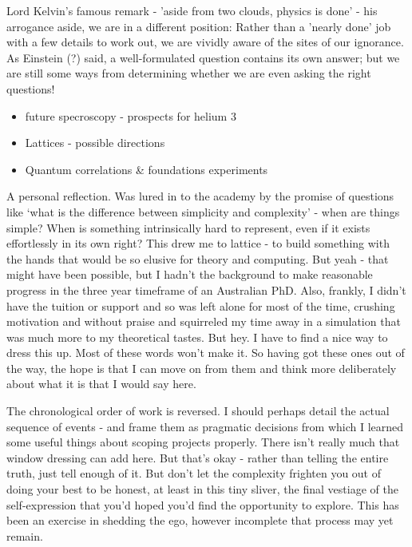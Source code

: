 Lord Kelvin's famous remark - 'aside from two clouds, physics is done' - his arrogance aside, we are in a different position: Rather than a 'nearly done' job with a few details to work out, we are vividly aware of the sites of our ignorance.
	As Einstein (?) said, a well-formulated question contains its own answer; but we are still some ways from determining whether we are even asking the right questions!

\begin{itemize}
\item
  future specroscopy - prospects for helium 3
\item
  Lattices - possible directions
\item
  Quantum correlations \& foundations experiments
\end{itemize}


A personal reflection.
	Was lured in to the academy by the promise of
questions like `what is the difference between simplicity and
complexity' - when are things simple? When is something intrinsically
hard to represent, even if it exists effortlessly in its own right? This
drew me to lattice - to build something with the hands that would be so
elusive for theory and computing.
	But yeah - that might have been
possible, but I hadn't the background to make reasonable progress in the
three year timeframe of an Australian PhD.
	Also, frankly, I didn't have
the tuition or support and so was left alone for most of the time,
crushing motivation and without praise and squirreled my time away in a
simulation that was much more to my theoretical tastes.
	But hey.
	I have
to find a nice way to dress this up.
	Most of these words won't make it.
So having got these ones out of the way, the hope is that I can move on
from them and think more deliberately about what it is that I would say
here.

The chronological order of work is reversed.
	I should perhaps detail the
actual sequence of events - and frame them as pragmatic decisions from
which I learned some useful things about scoping projects properly.
There isn't really much that window dressing can add here.
	But that's
okay - rather than telling the entire truth, just tell enough of it.
	But
don't let the complexity frighten you out of doing your best to be
honest, at least in this tiny sliver, the final vestiage of the
self-expression that you'd hoped you'd find the opportunity to explore.
This has been an exercise in shedding the ego, however incomplete that
process may yet remain.

